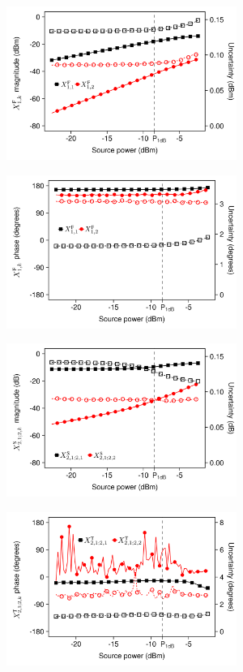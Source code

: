 \documentclass[../thesis/thesis.tex]{subfiles}
\begin{document}
\begin{refsection}
\begin{figure}
	\centering
	\begin{subfigure}{0.45\textwidth}
		\includegraphics[width=\linewidth,height=5cm]{fig4a}			
		\label{ch5_fig_FB1kdB}
	\end{subfigure}\hfil%
	\begin{subfigure}{0.45\textwidth}
		\includegraphics[width=\linewidth,height=5cm]{fig4b}
		\label{ch5_fig_FB1kp}
	\end{subfigure}
	\begin{subfigure}{0.45\textwidth}
		\includegraphics[width=\linewidth,height=5cm]{fig4c}
		\label{ch5_fig_s212kdB}
	\end{subfigure}\hfil%
	\begin{subfigure}{0.45\textwidth}
		\includegraphics[width=\linewidth,height=5cm]{fig4d}	

\end{subfigure}
\end{figure}
\end{refsection}
\end{document}
